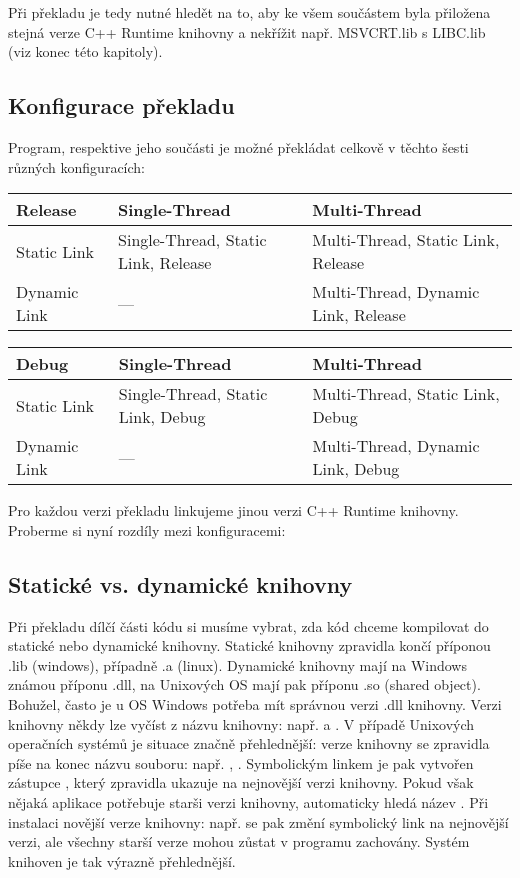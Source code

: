 Při překladu je tedy nutné hledět na to, aby ke všem součástem byla přiložena stejná verze C++ Runtime knihovny a nekřížit např. MSVCRT.lib s LIBC.lib (viz konec této kapitoly).

\subsection{Konfigurace překladu}
Program, respektive jeho součásti je možné překládat celkově v těchto šesti různých konfiguracích:

\hspace{-0.5cm}
\begin{tabular}{| l|| p{5cm} | p{5.5cm}  |}
  \hline                       
  Release & Single-Thread & Multi-Thread \\
  \hline
  \hline                     
  Static Link & Single-Thread, Static Link, Release & Multi-Thread, Static Link, Release\\
  \hline
  Dynamic Link & --- & Multi-Thread, Dynamic Link, Release\\
  \hline  
\end{tabular}

\hspace{-0.5cm}
\begin{tabular}{| l|| p{5cm} | p{5.5cm}  |}
  \hline                       
  Debug & Single-Thread & Multi-Thread \\
  \hline
  \hline                     
  Static Link & Single-Thread, Static Link, Debug & Multi-Thread, Static Link, Debug\\
  \hline
  Dynamic Link & --- & Multi-Thread, Dynamic Link, Debug\\
  \hline  
\end{tabular}

Pro každou verzi překladu linkujeme jinou verzi C++ Runtime knihovny.
Proberme si nyní rozdíly mezi konfiguracemi:

\subsection{Statické vs. dynamické knihovny}
Při překladu dílčí části kódu si musíme vybrat, zda kód chceme kompilovat do statické nebo dynamické knihovny. Statické knihovny zpravidla končí příponou .lib (windows), případně .a (linux). Dynamické knihovny mají na Windows známou příponu .dll, na Unixových OS mají pak příponu .so (shared object). Bohužel, často je u OS Windows potřeba mít správnou verzi .dll knihovny. Verzi knihovny někdy lze vyčíst z názvu knihovny: např.  a . V případě Unixových operačních systémů je situace značně přehlednější: verze knihovny se zpravidla píše na konec názvu souboru: např. , . Symbolickým linkem je pak vytvořen zástupce , který zpravidla ukazuje na nejnovější verzi knihovny. Pokud však nějaká aplikace potřebuje starši verzi knihovny, automaticky hledá název . Při instalaci novější verze knihovny: např.  se pak změní symbolický link na nejnovější verzi, ale všechny starší verze mohou zůstat v programu zachovány. Systém knihoven je tak výrazně přehlednější.

